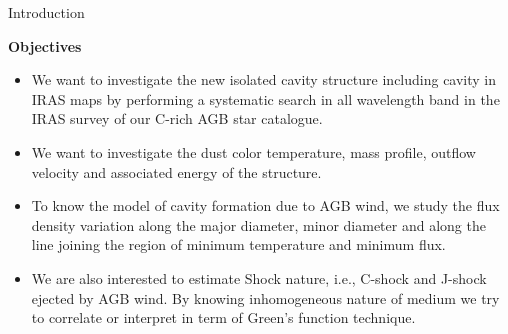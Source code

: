 \documentclass[12pt,a4paper]{beamer}
\begin{document}
\begin{frame}{Introduction}
\begin{block}{\centering\textbf{Objectives \vspace*{.25cm}}}
\begin{itemize}
\item We want to investigate the new isolated cavity structure including cavity in
 IRAS maps by performing a systematic search in all wavelength
 band in the IRAS survey of our C-rich AGB star catalogue.
\item We want to investigate the dust color temperature, mass
 profile, outflow velocity and associated energy of the structure.
\item To know the model of cavity formation due to AGB wind, we
study the flux density variation along the major diameter, minor
diameter and along the line joining the region of minimum
temperature and minimum flux.
\item We are also interested to
estimate Shock nature, i.e., C-shock and J-shock ejected by AGB
wind. By knowing inhomogeneous nature of medium we try to
correlate or interpret in term of Green's function technique.
\end{itemize}
\end{block}
\end{frame}

 \begin{frame}
\begin{center}
\Large\bf\color{red}{Theory}
\end{center}
\end{frame}
\end{document}
